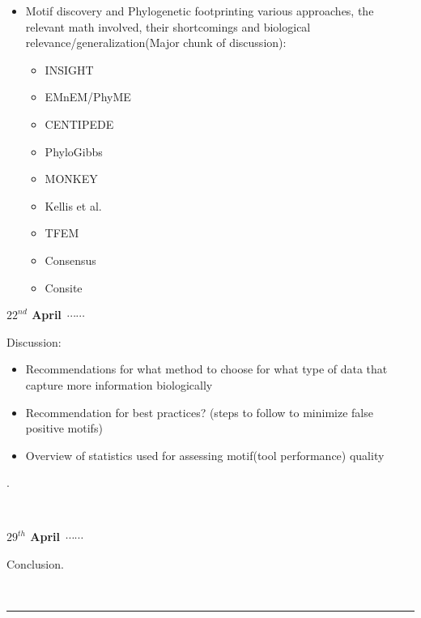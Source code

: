 \documentclass[a4paper,11pt]{article}
\newcommand\ytl[2]{
\parbox[b]{8em}{\hfill{\color{cyan}\bfseries\sffamily #1}~$\cdots\cdots$~}\makebox[0pt][c]{$\bullet$}\vrule\quad \parbox[c]{4.5cm}{\vspace{7pt}\color{red!40!black!80}\raggedright\sffamily #2.\\[7pt]}\\[-3pt]}
\begin{document}
\begin{table}
\begin{minipage}[t]{.7\linewidth}
{\begin{itemize}
\item Motif discovery and Phylogenetic footprinting various approaches, the relevant math involved, their shortcomings and biological relevance/generalization(Major chunk of discussion):
\begin{itemize}
\item INSIGHT
\item EMnEM/PhyME
\item CENTIPEDE
\item PhyloGibbs
\item MONKEY
\item Kellis et al.
\item TFEM
\item Consensus 
\item Consite
\end{itemize}
\end{itemize}}


\end{minipage}
\end{table}

\begin{table}
\centering
\footnotesize
\begin{minipage}[t]{.7\linewidth}
\ytl{$22^{nd}$ April}{Discussion: \begin{itemize}
\item Recommendations for what method to choose for what type of data that capture more information biologically
\item Recommendation for best practices? (steps to follow to minimize false positive motifs)
\item Overview of statistics used for assessing motif(tool performance) quality
\end{itemize}}
\bigskip
\ytl{$29^{th}$ April}{Conclusion}
\rule{\linewidth}{1pt}%
\end{minipage}%
\end{table}



\end{document}

